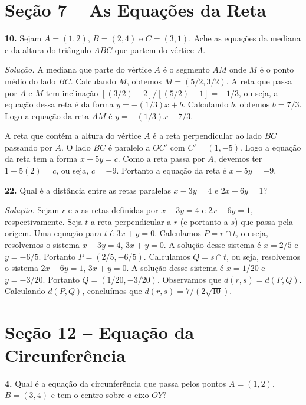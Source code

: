 \documentclass[a4paper,11pt]{article}
\begin{document}
\section*{Seção 7 -- As Equações da Reta}

\textbf{10.}
Sejam $A = (1,2)$, $B = (2,4)$ e $C = (3,1)$.
Ache as equações da mediana e da altura do triângulo $ABC$ que partem do vértice $A$.

\vspace{\baselineskip}

\emph{Solução.}
A mediana que parte do vértice $A$ é o segmento $AM$ onde $M$ é o ponto médio do lado $BC$.
Calculando $M$, obtemos $M = (5/2,3/2)$.
A reta que passa por $A$ e $M$ tem inclinação $[(3/2)-2]/[(5/2)-1] = -1/3$, ou seja, a equação dessa reta é da forma $y = -(1/3)x + b$.
Calculando $b$, obtemos $b = 7/3$.
Logo a equação da reta $AM$ é $y = -(1/3)x + 7/3$.

A reta que contém a altura do vértice $A$ é a reta perpendicular ao lado $BC$ passando por $A$.
O lado $BC$ é paralelo a $OC'$ com $C' = (1,-5)$.
Logo a equação da reta tem a forma $x - 5y = c$.
Como a reta passa por $A$, devemos ter $1-5(2) = c$, ou seja, $c = -9$.
Portanto a equação da reta é $x - 5y = -9$.

\vspace{\baselineskip}

\textbf{22.}
Qual é a distância entre as retas paralelas $x - 3y = 4$ e $2x - 6y = 1$?

\vspace{\baselineskip}

\emph{Solução.}
Sejam $r$ e $s$ as retas definidas por $x - 3y = 4$ e $2x - 6y = 1$, respectivamente.
Seja $t$ a reta perpendicular a $r$ (e portanto a $s$) que passa pela origem.
Uma equação para $t$ é $3x + y = 0$.
Calculamos $P = r \cap t$, ou seja, resolvemos o sistema $x-3y = 4$, $3x + y = 0$.
A solução desse sistema é $x = 2/5$ e $y = -6/5$.
Portanto $P = (2/5, -6/5)$.
Calculamos $Q = s \cap t$, ou seja, resolvemos o sistema $2x - 6y = 1$, $3x + y = 0$.
A solução desse sistema é $x = 1/20$ e $y = -3/20$.
Portanto $Q = (1/20, -3/20)$.
Observamos que $d(r,s) = d(P,Q)$.
Calculando $d(P,Q)$, concluímos que
$d(r,s) = 7/(2 \sqrt{10})$.

\section*{Seção 12 -- Equação da Circunferência}

\textbf{4.}
Qual é a equação da circunferência que passa pelos pontos $A = (1,2)$, $B = (3,4)$ e tem o centro sobre o eixo $OY$?
\end{document}
